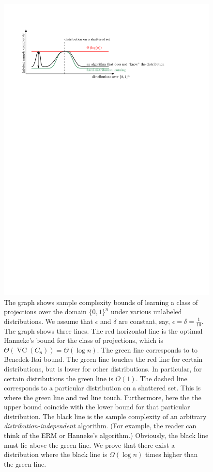 \documentclass[10pt]{article}
\DeclareMathOperator{\VC}{VC}
\begin{document}
\begin{figure}
\centering
\includegraphics{figure}
\caption{The graph shows sample complexity bounds of learning a class of
projections over the domain $\{0,1\}^n$ under various unlabeled distributions.
We assume that $\epsilon$ and $\delta$ are constant, say, $\epsilon = \delta =
\frac{1}{10}$. The graph shows three lines. The red horizontal line is the
optimal Hanneke's bound for the class of projections, which is
$\Theta(\VC(C_n)) = \Theta(\log n)$. The green line corresponds to to
Benedek-Itai bound. The green line touches the red line for certain
distributions, but is lower for other distributions. In particular, for certain
distributions the green line is $O(1)$. The dashed line corresponds
to a particular distribution on a shattered set. This is where the green line
and red line touch. Furthermore, here the the upper bound coincide
with the lower bound for that particular distribution.
The black line is the sample complexity
of an arbitrary \emph{distribution-independent} algorithm. (For example, the
reader can think of the ERM or Hanneke's algorithm.) Obviously, the black line
must lie above the green line. We prove that there exist a distribution where
the black line is $\Omega(\log n)$ times higher than the
green line.} \label{figure:sample-complexity}
\end{figure}
\end{document}
